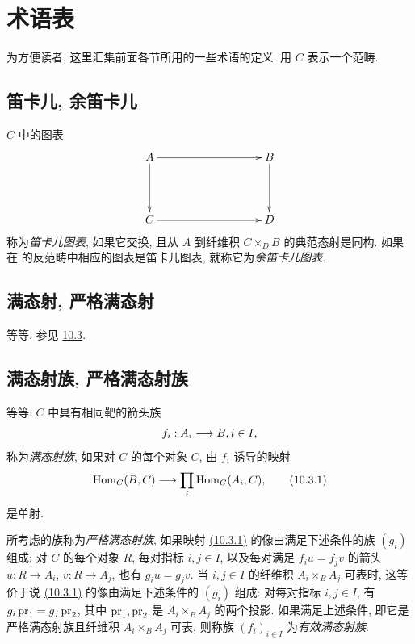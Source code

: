 \section{术语表}

为方便读者, 这里汇集前面各节所用的一些术语的定义. 用 $C$ 表示一个范畴.

\subsection{笛卡儿, 余笛卡儿}

$C$ 中的图表
\[
\xymatrix@C=3.25cm@R=1.5cm{
A\ar[r] \ar[d]& B \ar[d]\\
C\ar[r] & D }
\]
称为\emph{笛卡儿图表}, 如果它交换, 且从 $A$ 到纤维积 $C\times_D B$ 的典范态射是同构.
如果在  的反范畴中相应的图表是笛卡儿图表, 就称它为\emph{余笛卡儿图表}.

\subsection{满态射, 严格满态射}

等等\pageoriginale. 参见 \hyperref[I.sec10.3]{10.3}.

\subsection{满态射族, 严格满态射族}

等等: $C$ 中具有相同靶的箭头族
$$
f_i:A_i\longrightarrow B, i\in I{},
$$
称为\emph{满态射族}, 如果对 $C$ 的每个对象 $C$, 由 $f_i$ 诱导的映射
\hypertarget{sga4.exp.I.equation.10.3.1}{}\begin{equation}
\operatorname{Hom}_{C}(B,C)\longrightarrow \prod_i
\operatorname{Hom}_{C}(A_i,C),\tag{10.3.1}
\end{equation}
是单射.

所考虑的族称为\emph{严格满态射族}, 如果映射 \hyperlink{sga4.exp.I.equation.10.3.1}{(10.3.1)} 的像由满足下述条件的族 $(g_i)$ 组成: 对 $C$ 的每个对象 $R$, 每对指标 $i,j\in I$, 以及每对满足 $f_iu=f_jv$ 的箭头 $u:R\rightarrow A_i$, $v:R\rightarrow A_j$, 也有 $g_iu=g_jv$. 当 $i,j\in I$ 的纤维积 $A_i\times_BA_j$ 可表时, 这等价于说 \hyperlink{sga4.exp.I.equation.10.3.1}{(10.3.1)} 的像由满足下述条件的 $(g_i)$ 组成: 对每对指标 $i,j\in I$, 有 $g_i\operatorname{pr}_1=g_j\operatorname{pr}_2$, 其中 $\operatorname{pr}_1,\operatorname{pr}_2$ 是 $A_i\times_BA_j$ 的两个投影. 如果满足上述条件, 即它是严格满态射族且纤维积 $A_i\times_BA_j$ 可表, 则称族 $(f_i)_{i\in I}$ 为\emph{有效满态射族}.

